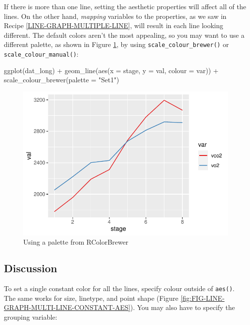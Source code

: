 \documentclass[
]{book}
\newenvironment{Shaded}{\begin{snugshade}}{\end{snugshade}}
\newcommand{\AttributeTok}[1]{\textcolor[rgb]{0.77,0.63,0.00}{#1}}
\newcommand{\FunctionTok}[1]{\textcolor[rgb]{0.00,0.00,0.00}{#1}}
\newcommand{\NormalTok}[1]{#1}
\newcommand{\SpecialCharTok}[1]{\textcolor[rgb]{0.00,0.00,0.00}{#1}}
\newcommand{\StringTok}[1]{\textcolor[rgb]{0.31,0.60,0.02}{#1}}
\begin{document}
If there is more than one line, setting the aesthetic properties will affect all of the lines. On the other hand, \emph{mapping} variables to the properties, as we saw in Recipe \ref{LINE-GRAPH-MULTIPLE-LINE}, will result in each line looking different. The default colors aren't the most appealing, so you may want to use a different palette, as shown in Figure \ref{fig:FIG-LINE-GRAPH-MULTI-LINE-PALETTE}, by using \texttt{scale\_colour\_brewer()} or \texttt{scale\_colour\_manual()}:

\begin{Shaded}
\begin{Highlighting}[]

\FunctionTok{ggplot}\NormalTok{(dat\_long) }\SpecialCharTok{+}
  \FunctionTok{geom\_line}\NormalTok{(}\FunctionTok{aes}\NormalTok{(}\AttributeTok{x =}\NormalTok{ stage, }\AttributeTok{y =}\NormalTok{ val, }\AttributeTok{colour =}\NormalTok{ var)) }\SpecialCharTok{+}
  \FunctionTok{scale\_colour\_brewer}\NormalTok{(}\AttributeTok{palette =} \StringTok{"Set1"}\NormalTok{)}
\end{Highlighting}
\end{Shaded}

\begin{figure}

{\centering \includegraphics[width=0.5\linewidth]{se201_stats_book_files/figure-latex/FIG-LINE-GRAPH-MULTI-LINE-PALETTE-1} 

}

\caption[Using a palette from RColorBrewer]{Using a palette from RColorBrewer}\label{fig:FIG-LINE-GRAPH-MULTI-LINE-PALETTE}
\end{figure}

\hypertarget{discussion-14}{%
\subsection{Discussion}\label{discussion-14}}

To set a single constant color for all the lines, specify colour outside of \texttt{aes()}. The same works for size, linetype, and point shape (Figure \ref{fig:FIG-LINE-GRAPH-MULTI-LINE-CONSTANT-AES}). You may also have to specify the grouping variable:
\end{document}
